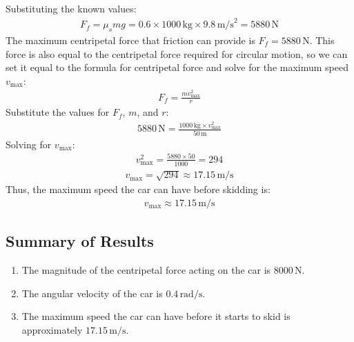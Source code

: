 \documentclass[letterpaper,10pt,english]{jupyterBook}
\begin{document}
\sphinxAtStartPar
Substituting the known values:
\begin{equation*}
\begin{split}
F_f = \mu_s mg = 0.6 \times 1000 \, \text{kg} \times 9.8 \, \text{m/s}^2 = 5880 \, \text{N}
\end{split}
\end{equation*}
\sphinxAtStartPar
The maximum centripetal force that friction can provide is \(F_f = 5880 \, \text{N}\). This force is also equal to the centripetal force required for circular motion, so we can set it equal to the formula for centripetal force and solve for the maximum speed \(v_\text{max}\):
\begin{equation*}
\begin{split}
F_f = \frac{m v_\text{max}^2}{r}
\end{split}
\end{equation*}
\sphinxAtStartPar
Substitute the values for \(F_f\), \(m\), and \(r\):
\begin{equation*}
\begin{split}
5880 \, \text{N} = \frac{1000 \, \text{kg} \times v_\text{max}^2}{50 \, \text{m}}
\end{split}
\end{equation*}
\sphinxAtStartPar
Solving for \(v_\text{max}\):
\begin{equation*}
\begin{split}
v_\text{max}^2 = \frac{5880 \times 50}{1000} = 294
\end{split}
\end{equation*}\begin{equation*}
\begin{split}
v_\text{max} = \sqrt{294} \approx 17.15 \, \text{m/s}
\end{split}
\end{equation*}
\sphinxAtStartPar
Thus, the maximum speed the car can have before skidding is:
\begin{equation*}
\begin{split}
v_\text{max} \approx 17.15 \, \text{m/s}
\end{split}
\end{equation*}

\subsection{Summary of Results}
\label{\detokenize{prerequisites:id18}}\begin{enumerate}
%
\item {} 
\sphinxAtStartPar
The magnitude of the centripetal force acting on the car is \(8000 \, \text{N}\).

\item {} 
\sphinxAtStartPar
The angular velocity of the car is \(0.4 \, \text{rad/s}\).

\item {} 
\sphinxAtStartPar
The maximum speed the car can have before it starts to skid is approximately \(17.15 \, \text{m/s}\).

\end{enumerate}
\end{document}
